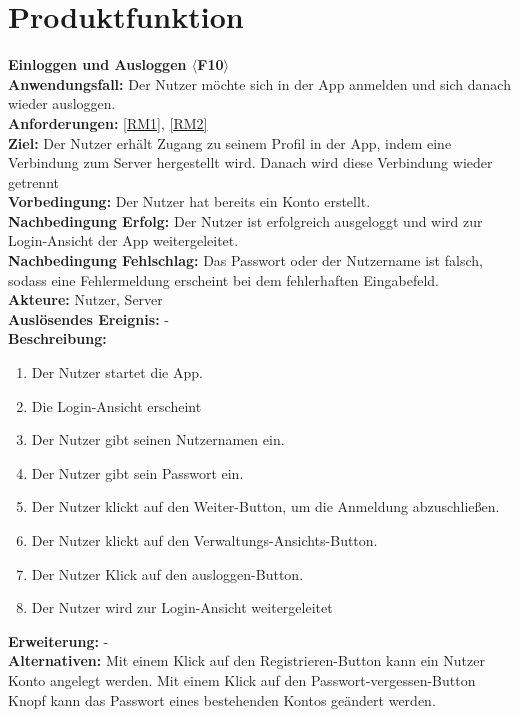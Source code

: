 \documentclass[parskip=full]{scrartcl}
\begin{document}
\section{Produktfunktion}
\textbf{Einloggen und Ausloggen $\langle$F10$\rangle$}\\
\textbf{Anwendungsfall:} Der Nutzer möchte sich in der App anmelden und sich danach wieder ausloggen.\\
\textbf{Anforderungen:} \ref{RM1}, \ref{RM2}\\
\textbf{Ziel:} Der Nutzer erhält Zugang zu seinem Profil in der App, indem eine Verbindung zum Server hergestellt wird. Danach wird diese Verbindung wieder getrennt\\
\textbf{Vorbedingung:} Der Nutzer hat bereits ein Konto erstellt.\\
\textbf{Nachbedingung Erfolg:} Der Nutzer ist erfolgreich ausgeloggt und wird zur Login-Ansicht der App weitergeleitet.\\
\textbf{Nachbedingung Fehlschlag:} Das Passwort oder der Nutzername ist falsch, sodass eine Fehlermeldung erscheint bei dem fehlerhaften Eingabefeld.\\
\textbf{Akteure:} Nutzer, Server\\
\textbf{Auslösendes Ereignis:} -\\
\textbf{Beschreibung:}
\begin{enumerate}
    \item Der Nutzer startet die App.
    \item Die Login-Ansicht erscheint
    \item Der Nutzer gibt seinen Nutzernamen ein.
    \item Der Nutzer gibt sein Passwort ein.
    \item Der Nutzer klickt auf den Weiter-Button, um die Anmeldung abzuschließen.
    \item Der Nutzer klickt auf den Verwaltungs-Ansichts-Button.
    \item Der Nutzer Klick auf den ausloggen-Button.
    \item Der Nutzer wird zur Login-Ansicht weitergeleitet
\end{enumerate}
\textbf{Erweiterung:} -\\
\textbf{Alternativen:} Mit einem Klick auf den Registrieren-Button kann ein Nutzer Konto angelegt werden. Mit einem Klick auf den Passwort-vergessen-Button Knopf kann das Passwort eines bestehenden Kontos geändert werden.
\newpage
\end{document}
